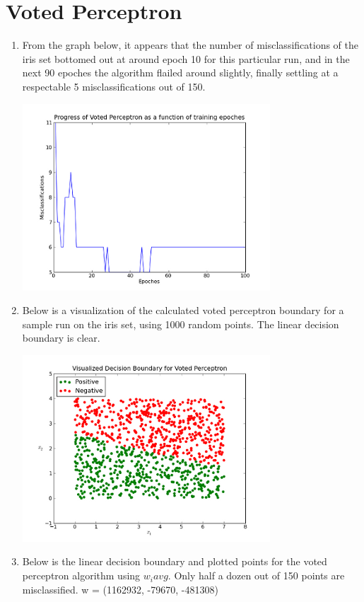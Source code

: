 \documentclass{article}
\begin{document}
\section{Voted Perceptron}
\begin{enumerate}

\item
From the graph below, it appears that the number of misclassifications of the
iris set
bottomed out at around epoch 10 for this particular run, and in the next 90
epoches the algorithm flailed around slightly,
finally settling at a respectable 5 misclassifications out of 150.

\includegraphics{voted_perceptron_error.png}

\item
Below is a visualization of the calculated voted perceptron boundary for a
sample run on the iris set, using 1000 random points. The linear decision
boundary is clear.

\includegraphics{voted_perceptron.png}

\newpage

\item
Below is the linear decision boundary and plotted points for the voted
perceptron algorithm using $w_i{avg}$. Only half a dozen out of 150 points are
misclassified. w = (1162932, -79670, -481308)


\end{enumerate}
\end{document}
